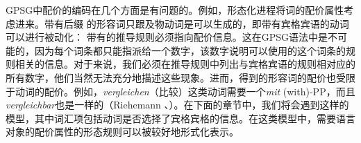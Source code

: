 GPSG中配价的编码在几个方面是有问题的。例如，形态化进程将词的配价属性考虑进来。带有后缀 的形容词只跟及物动词是可以生成的，即带有宾格宾语的动词可以进行被动化：
\eal\settowidth{}
\zl
带有的推导规则必须指向配价信息。这在GPSG语法中是不可能的，因为每个词条都只能指派给一个数字，该数字说明可以使用的这个词条的规则相关的信息。对于\bards 来说，我们必须在推导规则中列出与宾格宾语的规则相对应的所有数字，他们当然无法充分地描述这些现象。进而，得到的形容词的配价也受限于动词的配价。例如，\emph{vergleichen}（比较）这类动词需要一个\emph{mit} (with)-PP，而且\emph{vergleichbar}也是一样的（Riehemann \citeyear[, 54]{Riehemann93a}、\citeyear[]{Riehemann98a}）。在下面的章节中，我们将会遇到这样的模型，其中词汇项包括动词是否选择了宾格宾格的信息。在这类模型中，需要语言对象的配价属性的形态规则可以被较好地形式化表示。

